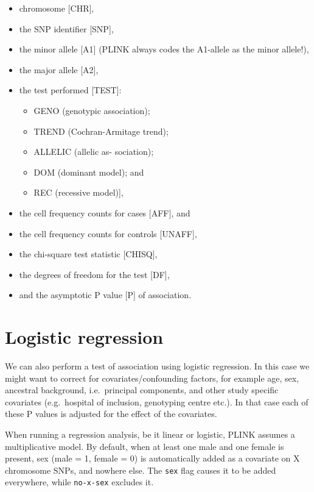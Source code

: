 \documentclass[
]{book}
\providecommand{\tightlist}{%
  \setlength{\itemsep}{0pt}\setlength{\parskip}{0pt}}
\begin{document}
\begin{itemize}
\tightlist
\item
  chromosome {[}CHR{]},
\item
  the SNP identifier {[}SNP{]},
\item
  the minor allele {[}A1{]} (PLINK always codes the A1-allele as the minor allele!),
\item
  the major allele {[}A2{]},
\item
  the test performed {[}TEST{]}:

  \begin{itemize}
  \tightlist
  \item
    GENO (genotypic association);
  \item
    TREND (Cochran-Armitage trend);
  \item
    ALLELIC (allelic as- sociation);
  \item
    DOM (dominant model); and
  \item
    REC (recessive model){]},
  \end{itemize}
\item
  the cell frequency counts for cases {[}AFF{]}, and
\item
  the cell frequency counts for controls {[}UNAFF{]},
\item
  the chi-square test statistic {[}CHISQ{]},
\item
  the degrees of freedom for the test {[}DF{]},
\item
  and the asymptotic P value {[}P{]} of association.
\end{itemize}

\hypertarget{logistic-regression}{%
\section{Logistic regression}\label{logistic-regression}}

We can also perform a test of association using logistic regression. In this case we might want to correct for covariates/confounding factors, for example age, sex, ancestral background, i.e.~principal components, and other study specific covariates (e.g.~hospital of inclusion, genotyping centre etc.). In that case each of these P values is adjusted for the effect of the covariates.

When running a regression analysis, be it linear or logistic, PLINK assumes a multiplicative model. By default, when at least one male and one female is present, sex (male = 1, female = 0) is automatically added as a covariate on X chromosome SNPs, and nowhere else. The \texttt{sex} flag causes it to be added everywhere, while \texttt{no-x-sex} excludes it.
\end{document}
